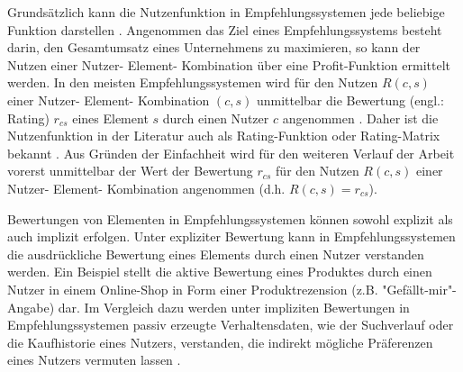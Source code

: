Grundsätzlich kann die Nutzenfunktion in Empfehlungssystemen jede beliebige Funktion darstellen \cite[S. 735]{adomavicius:inproceedings}.
Angenommen das Ziel eines Empfehlungssystems besteht darin, den Gesamtumsatz eines Unternehmens zu maximieren, so kann der Nutzen einer Nutzer- Element- Kombination über eine Profit-Funktion ermittelt werden.
In den meisten Empfehlungssystemen wird für den Nutzen $R(c,s)$ einer Nutzer- Element- Kombination $(c,s)$ unmittelbar die Bewertung (engl.: Rating) $r_{cs}$ eines Element $s$ durch einen Nutzer $c$ angenommen \cite[S. 735]{adomavicius:inproceedings}\cite[S. 9]{ricci:inbook}\cite[S. 11]{recommenderSystems:2016}.
Daher ist die Nutzenfunktion in der Literatur auch als Rating-Funktion oder Rating-Matrix bekannt \cite[S. 49]{adomavicius:inproceedings:2}\cite[S. 91]{ekstrand:article}\cite[S. 11]{recommenderSystems:2016}.
Aus Gründen der Einfachheit wird für den weiteren Verlauf der Arbeit vorerst unmittelbar der Wert der Bewertung $r_{cs}$ für den Nutzen $R(c,s)$ einer Nutzer- Element- Kombination angenommen (d.h. $R(c,s) = r_{cs}$).

Bewertungen von Elementen in Empfehlungssystemen können sowohl explizit als auch implizit erfolgen.
Unter expliziter Bewertung kann in Empfehlungssystemen die ausdrückliche Bewertung eines Elements durch einen Nutzer verstanden werden.
Ein Beispiel stellt die aktive Bewertung eines Produktes durch einen Nutzer in einem Online-Shop in Form einer Produktrezension (z.B. "Gefällt-mir"-Angabe) dar.
Im Vergleich dazu werden unter impliziten Bewertungen in Empfehlungssystemen passiv erzeugte Verhaltensdaten, wie der Suchverlauf oder die Kaufhistorie eines Nutzers, verstanden, die indirekt mögliche Präferenzen eines Nutzers vermuten lassen \cite[S. 149]{jadidinejad:inproceedings}\cite[S. 403]{unternährer:article}.

